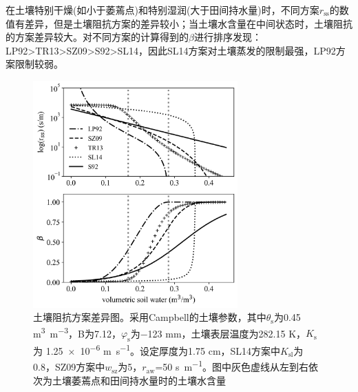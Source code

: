 在土壤特别干燥(如小于萎蔫点)和特别湿润(大于田间持水量)时，不同方案\(r_{\mathrm{ss}}\)的数值有差异，但是土壤阻抗方案的差异较小；当土壤水含量在中间状态时，土壤阻抗的方案差异较大。对不同方案的计算得到的$\beta$进行排序发现：LP92\textgreater TR13\textgreater SZ09\textgreater S92\textgreater SL14，因此SL14方案对土壤蒸发的限制最强，LP92方案限制较弱。

{
  \begin{figure}[htbp]
    \centering
    \includegraphics[width=0.7\textwidth]{Figures/地表湍流交换过程/土壤阻抗方案差异图.png}
    \caption[土壤阻抗方案差异图]{土壤阻抗方案差异图。采用Campbell的土壤参数，其中\(\theta_{\mathrm{s}}\)为0.45 \unit{m^{3}.m^{-3}}，B为7.12，\(\varphi_{\mathrm{s}}\)为\num{-123} \unit {mm}，土壤表层温度为282.15 K，\(K_{\mathrm{s}}\)为 \num{1.25e-6} \unit{m.s^{-1}}。设定厚度为1.75 cm，SL14方案中\(K_{\mathrm{sl}}\)为0.8，SZ09方案中\(w_{\mathrm{sz}}\)为5，\(r_{\mathrm{aw}}\)=50 \unit {s.m^{-1}}。图中灰色虚线从左到右依次为土壤萎蔫点和田间持水量时的土壤水含量}
    \label{fig:土壤阻抗方案差异图}
  \end{figure}
}

